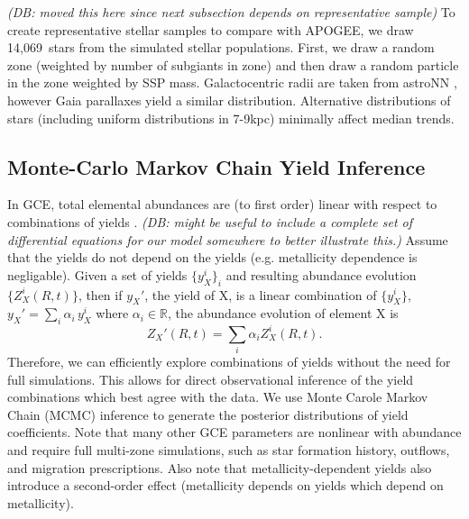 \documentclass[fleqn,
usenatbib]{mnras}
\newcommand{\nsubgiants}{14,069}
\newcommand{\dbnote}[1]{ {\color{Thistle} \textit{\small (DB: #1)}} }
\begin{document}
\dbnote{moved this here since next subsection depends on representative sample}
To create representative stellar samples to compare with APOGEE, 
we draw \nsubgiants\ stars from the simulated stellar populations. First, we draw a random zone (weighted by number of subgiants in zone) and then draw a random particle in the zone weighted by SSP mass.
Galactocentric radii are taken from astroNN \citep{leung+bovy19, leung+bovy19b}, however Gaia parallaxes yield a similar distribution. Alternative distributions of stars (including uniform distributions in 7-9kpc) minimally affect median trends.

\subsection{Monte-Carlo Markov Chain Yield Inference} \label{sec:mcmc_methods}

In GCE, total elemental abundances are (to first order) linear with respect to combinations of yields \citep[e.g.][]{WAF17}.
\dbnote{might be useful to include a complete set of differential equations for our model somewhere to better illustrate this.}
Assume that the yields do not depend on the yields (e.g. metallicity dependence is negligable). 
Given a set of yields $\{y_X^i\}_i$ and resulting abundance evolution $\{Z_{X}^i(R, t) \}$, then if $y_X'$, the yield of X, is a linear combination of $\{y_X^i\}$, $y_X' = \sum_i \alpha_i\, y_X^i$ where $\alpha_i \in \mathbb{R}$, the abundance evolution of element X is
\begin{equation}\label{eq:lin_combo}
    Z_X'(R, t) = \sum_i \alpha_i Z_X^i(R, t).
\end{equation}
Therefore, we can efficiently explore combinations of yields without the need for full simulations. This allows for direct observational inference of the yield combinations which best agree with the data.
We use Monte Carole Markov Chain (MCMC) inference to generate the posterior distributions of yield coefficients. Note that many other GCE parameters are nonlinear with abundance and require full multi-zone simulations, such as star formation history, outflows, and migration prescriptions. 
Also note that metallicity-dependent yields also introduce a second-order effect (metallicity depends on yields which depend on metallicity).
\end{document}
